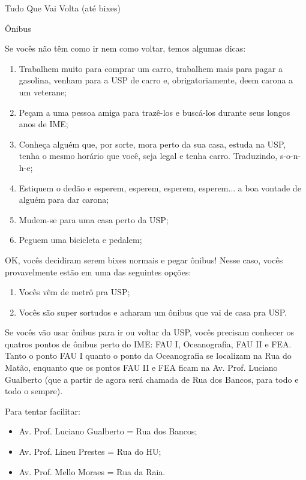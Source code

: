 \begin{secao}{Tudo Que Vai Volta (até bixes)}

\begin{subsecao}{Ônibus}

Se vocês não têm como ir nem como voltar, temos algumas dicas:

\begin{enumerate}
  \item Trabalhem muito para comprar um carro,
  trabalhem mais para pagar a gasolina,
  venham para a USP de carro e, obrigatoriamente, deem carona a um veterane;

  \item Peçam a uma pessoa amiga para trazê-los e buscá-los durante seus
  longos anos de IME;

  \item Conheça alguém que, por sorte, mora perto da sua casa, estuda na USP,
  tenha o mesmo horário que você, seja legal e tenha carro. Traduzindo, s-o-n-h-e;

  \item Estiquem o dedão e esperem, esperem, esperem, esperem... a boa vontade
  de alguém para dar carona;

  \item Mudem-se para uma casa perto da USP;

  \item Peguem uma bicicleta e pedalem;

\end{enumerate}

OK, vocês decidiram serem bixes normais e pegar ônibus! Nesse caso, vocês
provavelmente estão em uma das seguintes opções:

\begin{enumerate}
  \item Vocês vêm de metrô pra USP;
  \item Vocês são super sortudos e acharam um ônibus que vai de casa pra USP.
\end{enumerate}

Se vocês vão usar ônibus para ir ou voltar da USP, vocês precisam conhecer
os quatros pontos de ônibus perto do IME: FAU I, Oceanografia, FAU II e FEA.
Tanto o ponto FAU I quanto o ponto da Oceanografia se localizam na Rua do Matão,
enquanto que os pontos FAU II e FEA ficam na Av. Prof. Luciano Gualberto (que a
partir de agora será chamada de Rua dos Bancos, para todo e todo o sempre).

Para tentar facilitar:
\begin{itemize}
	\item Av. Prof. Luciano Gualberto = Rua dos Bancos;
	\item Av. Prof. Lineu Prestes = Rua do HU;
	\item Av. Prof. Mello Moraes = Rua da Raia.
\end{itemize}


\end{subsecao}
\end{secao}
